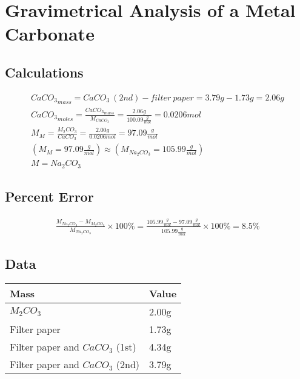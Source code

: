 \documentclass{article}
\begin{document}
\section{Gravimetrical Analysis of a Metal Carbonate}

\subsection{Calculations}
\begin{gather}
    {CaCO_3}_{mass} = CaCO_3\ (2nd) - filter\ paper = 3.79g - 1.73g = 2.06g \\
    {CaCO_3}_{moles} = \frac{{CaCO_3}_{mass}}{M_{CaCO_3}} = \frac{2.06g}{100.09\frac{g}{mol}} = 0.0206mol \\
    M_M = \frac{M_2CO_3}{CaCO_3} = \frac{2.00g}{0.0206mol} = 97.09\frac{g}{mol} \\
    \left( M_M = 97.09\frac{g}{mol} \right) \approx \left( M_{Na_2CO_3} = 105.99\frac{g}{mol} \right) \\
    M = Na_2CO_3
\end{gather}

\subsection{Percent Error}
\begin{gather}
    \frac{M_{Na_2CO_3} - M_{M_2CO_3}}{M_{Na_2CO_3}} \times 100\% = \frac{105.99\frac{g}{mol} - 97.09\frac{g}{mol}}{105.99\frac{g}{mol}} \times 100\% = 8.5\%
\end{gather}

\subsection{Data}
\centering
\begin{tabular}{p{5cm}|p{2cm}}
    \toprule
    Mass & Value \\
    \midrule
    \(M_2CO_3\) & 2.00g \\
    Filter paper & 1.73g \\
    Filter paper and \(CaCO_3\) (1st) & 4.34g \\
    Filter paper and \(CaCO_3\) (2nd) & 3.79g \\
\end{tabular}
\end{document}
